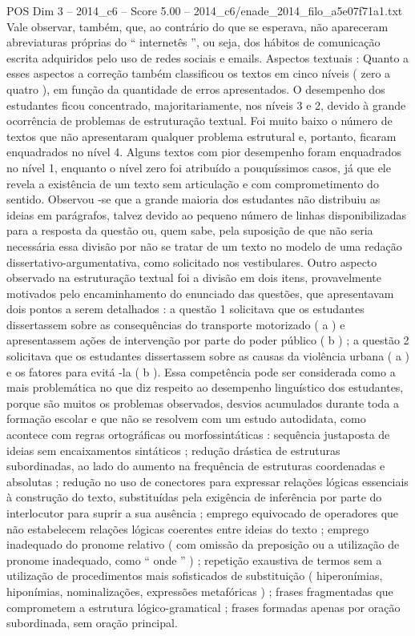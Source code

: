 \begin{textsample}{POS Dim 3 – 2014\_c6 – Score 5.00 – 2014\_c6/enade\_2014\_filo\_a5e07f71a1.txt}
Vale observar, também, que, ao contrário do que se esperava, não apareceram abreviaturas próprias do “ internetês ”, ou seja, dos hábitos de comunicação escrita adquiridos pelo uso de redes sociais e emails.
Aspectos textuais : Quanto a esses aspectos a correção também classificou os textos em cinco níveis ( zero a quatro ), em função da quantidade de erros apresentados.
O desempenho dos estudantes ficou concentrado, majoritariamente, nos níveis 3 e 2, devido à grande ocorrência de problemas de estruturação textual.
Foi muito baixo o número de textos que não apresentaram qualquer problema estrutural e, portanto, ficaram enquadrados no nível 4.
Alguns textos com pior desempenho foram enquadrados no nível 1, enquanto o nível zero foi atribuído a pouquíssimos casos, já que ele revela a existência de um texto sem articulação e com comprometimento do sentido.
Observou -se que a grande maioria dos estudantes não distribuiu as ideias em parágrafos, talvez devido ao pequeno número de linhas disponibilizadas para a resposta da questão ou, quem sabe, pela suposição de que não seria necessária essa divisão por não se tratar de um texto no modelo de uma redação dissertativo-argumentativa, como solicitado nos vestibulares.
Outro aspecto observado na estruturação textual foi a divisão em dois itens, provavelmente motivados pelo encaminhamento do enunciado das questões, que apresentavam dois pontos a serem detalhados : a questão 1 solicitava que os estudantes dissertassem sobre as consequências do transporte motorizado ( a ) e apresentassem ações de intervenção por parte do poder público ( b ) ; a questão 2 solicitava que os estudantes dissertassem sobre as causas da violência urbana ( a ) e os fatores para evitá -la ( b ).
Essa competência pode ser considerada como a mais problemática no que diz respeito ao desempenho linguístico dos estudantes, porque são muitos os problemas observados, desvios acumulados durante toda a formação escolar e que não se resolvem com um estudo autodidata, como acontece com regras ortográficas ou morfossintáticas : sequência justaposta de ideias sem encaixamentos sintáticos ; redução drástica de estruturas subordinadas, ao lado do aumento na frequência de estruturas coordenadas e absolutas ; redução no uso de conectores para expressar relações lógicas essenciais à construção do texto, substituídas pela exigência de inferência por parte do interlocutor para suprir a sua ausência ; emprego equivocado de operadores que não estabelecem relações lógicas coerentes entre ideias do texto ; emprego inadequado do pronome relativo ( com omissão da preposição ou a utilização de pronome inadequado, como “ onde ” ) ; repetição exaustiva de termos sem a utilização de procedimentos mais sofisticados de substituição ( hiperonímias, hiponímias, nominalizações, expressões metafóricas ) ; frases fragmentadas que comprometem a estrutura lógico-gramatical ; frases formadas apenas por oração subordinada, sem oração principal.

\end{textsample}

